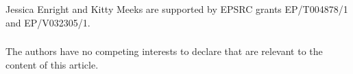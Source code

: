 \documentclass[runningheads]{llncs}
\begin{document}
\begin{credits}
\subsubsection{\ackname} Jessica Enright and Kitty Meeks are supported by EPSRC grants EP/T004878/1 and EP/V032305/1. 

\subsubsection{\discintname}
The authors have no competing interests to declare that are
relevant to the content of this article. 
\end{credits}

\pagebreak


\end{document}
